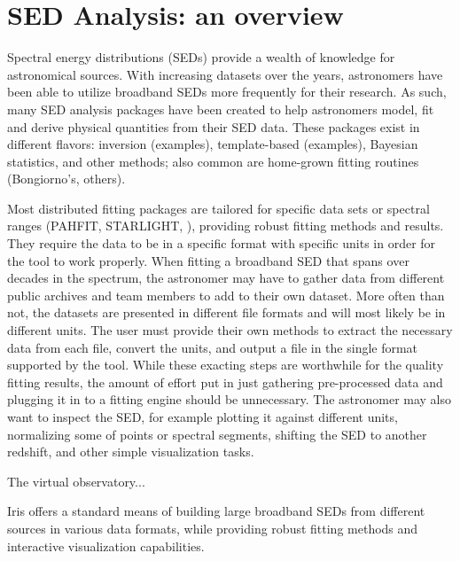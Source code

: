 \label{everyday_seds}
\section{SED Analysis: an overview}

Spectral energy distributions (SEDs) provide a wealth of knowledge for astronomical sources. With increasing datasets over the years, astronomers have been able to utilize broadband SEDs more frequently for their research. As such, many SED analysis packages have been created to help astronomers model, fit and derive physical quantities from their SED data. These packages exist in different flavors: inversion (examples), template-based (examples), Bayesian statistics, and other methods; also common are home-grown fitting routines (Bongiorno's, others). 

Most distributed fitting packages are tailored for specific data sets or spectral ranges (PAHFIT, STARLIGHT, ), providing robust fitting methods and results. They require the data to be in a specific format with specific units in order for the tool to work properly. When fitting a broadband SED that spans over decades in the spectrum, the astronomer may have to gather data from different public archives and team members to add to their own dataset. More often than not, the datasets are presented in different file formats and will most likely be in different units. The user must provide their own methods to extract the necessary data from each file, convert the units, and output a file in the single format supported by the tool. While these exacting steps are worthwhile for the quality fitting results, the amount of effort put in just gathering pre-processed data and plugging it in to a fitting engine should be unnecessary. The astronomer may also want to inspect the SED, for example plotting it against different units, normalizing some of points or spectral segments, shifting the SED to another redshift, and other simple visualization tasks.

The virtual observatory...

Iris offers a standard means of building large broadband SEDs from different sources in various data formats, while providing robust fitting methods and interactive visualization capabilities.